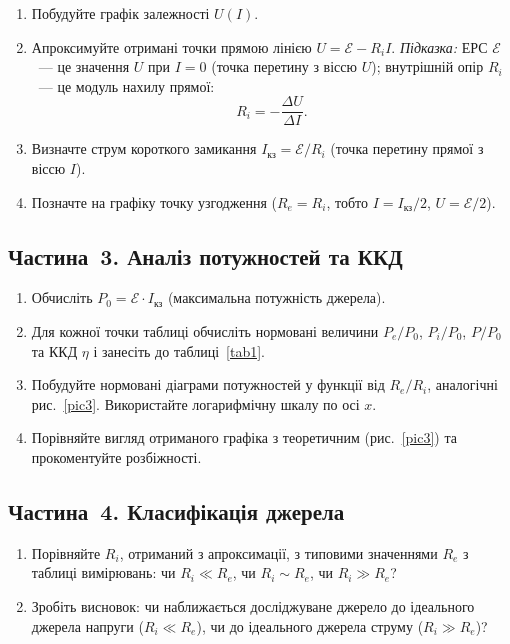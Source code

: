 \begin{enumerate}
    \item Побудуйте графік залежності $U(I)$.

    \item Апроксимуйте отримані точки прямою лінією $U = \mathcal{E} - R_i I$. \emph{Підказка:} ЕРС $\mathcal{E}$~--- це значення $U$ при $I = 0$ (точка перетину з віссю $U$); внутрішній опір $R_i$~--- це модуль нахилу прямої:
    \begin{equation*}
        R_i = -\frac{\Delta U}{\Delta I}.
    \end{equation*}

    \item Визначте струм короткого замикання $I_\text{кз} = \mathcal{E}/R_i$ (точка перетину прямої з віссю $I$).

    \item Позначте на графіку точку узгодження ($R_e = R_i$, тобто $I = I_\text{кз}/2$, $U = \mathcal{E}/2$).
\end{enumerate}

\subsection*{Частина~3. Аналіз потужностей та ККД}

\begin{enumerate}
    \item Обчисліть $P_0 = \mathcal{E} \cdot I_\text{кз}$ (максимальна потужність джерела).

    \item Для кожної точки таблиці обчисліть нормовані величини $P_e/P_0$, $P_i/P_0$, $P/P_0$ та ККД $\eta$ і занесіть до таблиці~\ref{tab1}.

    \item Побудуйте нормовані діаграми потужностей у функції від $R_e/R_i$, аналогічні рис.~\ref{pic3}. Використайте логарифмічну шкалу по осі $x$.

    \item Порівняйте вигляд отриманого графіка з теоретичним (рис.~\ref{pic3}) та прокоментуйте розбіжності.
\end{enumerate}

\subsection*{Частина~4. Класифікація джерела}

\begin{enumerate}
    \item Порівняйте $R_i$, отриманий з апроксимації, з типовими значеннями $R_e$ з таблиці вимірювань: чи $R_i \ll R_e$, чи $R_i \sim R_e$, чи $R_i \gg R_e$?
    \item Зробіть висновок: чи наближається досліджуване джерело до ідеального джерела напруги ($R_i \ll R_e$), чи до ідеального джерела струму ($R_i \gg R_e$)?
\end{enumerate}


